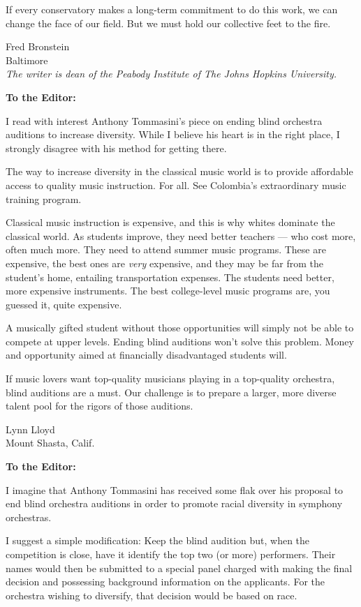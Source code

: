 If every conservatory makes a long-term commitment to do this work, we
can change the face of our field. But we must hold our collective feet
to the fire.

Fred Bronstein\\
Baltimore\\
\emph{The writer is dean of the Peabody Institute of The Johns Hopkins
University.}

\textbf{To the Editor:}

I read with interest Anthony Tommasini's piece on ending blind orchestra
auditions to increase diversity. While I believe his heart is in the
right place, I strongly disagree with his method for getting there.

The way to increase diversity in the classical music world is to provide
affordable access to quality music instruction. For all. See Colombia's
extraordinary music training program.

Classical music instruction is expensive, and this is why whites
dominate the classical world. As students improve, they need better
teachers --- who cost more, often much more. They need to attend summer
music programs. These are expensive, the best ones are \emph{very}
expensive, and they may be far from the student's home, entailing
transportation expenses. The students need better, more expensive
instruments. The best college-level music programs are, you guessed it,
quite expensive.

A musically gifted student without those opportunities will simply not
be able to compete at upper levels. Ending blind auditions won't solve
this problem. Money and opportunity aimed at financially disadvantaged
students will.

If music lovers want top-quality musicians playing in a top-quality
orchestra, blind auditions are a must. Our challenge is to prepare a
larger, more diverse talent pool for the rigors of those auditions.

Lynn Lloyd\\
Mount Shasta, Calif.

\textbf{To the Editor:}

I imagine that Anthony Tommasini has received some flak over his
proposal to end blind orchestra auditions in order to promote racial
diversity in symphony orchestras.

I suggest a simple modification: Keep the blind audition but, when the
competition is close, have it identify the top two (or more) performers.
Their names would then be submitted to a special panel charged with
making the final decision and possessing background information on the
applicants. For the orchestra wishing to diversify, that decision would
be based on race.

